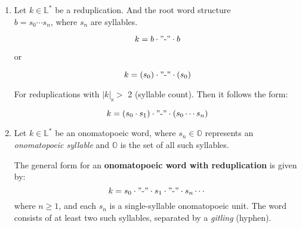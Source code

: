 \begin{enumerate}
    \item 
        Let \(k \in \mathbb{L}^*\) be a reduplication. And the root word structure
        \\ \(b = s_0\cdots s_n\), where \(s_n\) are syllables.
        
        \[
            k = b \cdot "\text{-}" \cdot b
        \]

        or

        \[
            k = (s_0) \cdot "\text{-}" \cdot (s_0)
        \]
        
        For reduplications with $|k|_{\text{s}}>$ 2 (syllable count). Then it follows the form:
        
        \[
            k = (s_0 \cdot s_1) \cdot "\text{-}" \cdot (s_0 \cdots s_n)
        \]
        


    \item
        Let \( k \in \mathbb{L}^* \) be an onomatopoeic word, where \( s_n \in \mathbb{O} \) represents an \textit{onomatopoeic syllable} and \( \mathbb{O} \) is the set of all such syllables. 
    
        The general form for an \textbf{onomatopoeic word with reduplication} is given by:
        \[
            k = s_0 \cdot "\text{-}" \cdot s_1 \cdot "\text{-}" \cdot s_n \cdots
        \]
        where \( n \geq 1 \), and each \( s_n \) is a single-syllable onomatopoeic unit. The word consists of at least two such syllables, separated by a \textit{gitling} (hyphen).

\end{enumerate}